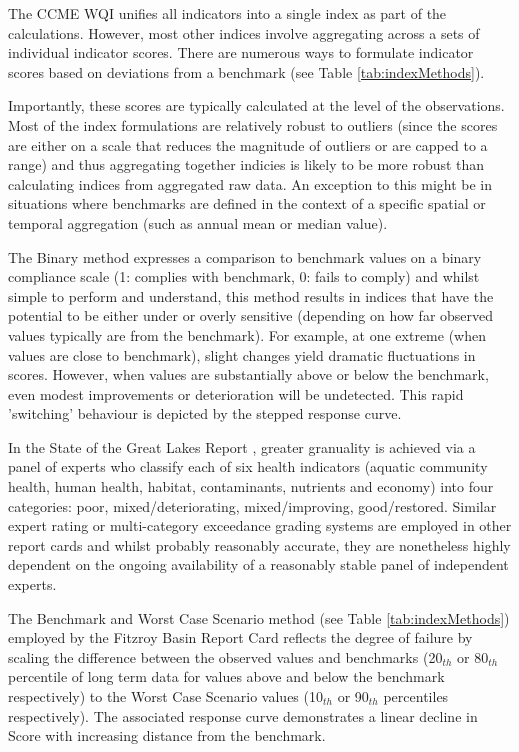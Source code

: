 The CCME WQI unifies all indicators into a single index as part of the calculations.  However, most
other indices involve aggregating across a sets of individual indicator scores.  There are numerous
ways to formulate indicator scores based on deviations from a benchmark (see Table
\ref{tab:indexMethods}).

Importantly, these scores are typically calculated at the level of the observations.  Most of the
index formulations are relatively robust to outliers (since the scores are either on a scale that
reduces the magnitude of outliers or are capped to a range) and thus aggregating together indicies
is likely to be more robust than calculating indices from aggregated raw data.  An exception to this
might be in situations where benchmarks are defined in the context of a specific spatial or temporal
aggregation (such as annual mean or median value).

The Binary method expresses a comparison to benchmark values on a binary compliance scale (1:
complies with benchmark, 0: fails to comply) and whilst simple to perform and understand, this
method results in indices that have the potential to be either under or overly sensitive (depending
on how far observed values typically are from the benchmark).  For example, at one extreme (when
values are close to benchmark), slight changes yield dramatic fluctuations in scores.  However, when
values are substantially above or below the benchmark, even modest improvements or deterioration
will be undetected.  This rapid 'switching' behaviour is depicted by the stepped response curve.

In the State of the Great Lakes Report \citep{EPA/EC-1995}, greater granuality is achieved via a
panel of experts who classify each of six health indicators (aquatic community health, human health,
habitat, contaminants, nutrients and economy) into four categories: poor, mixed/deteriorating,
mixed/improving, good/restored.  Similar expert rating or multi-category exceedance grading systems
are employed in other report cards \citep[e.g Tamar estuary Report Card;][]{Attard-2012} and whilst
probably reasonably accurate, they are nonetheless highly dependent on the ongoing availability of a
reasonably stable panel of independent experts.

The Benchmark and Worst Case Scenario method (see Table \ref{tab:indexMethods}) employed by the
Fitzroy Basin Report Card \citep{Jones-2013} reflects the degree of failure by scaling the
difference between the observed values and benchmarks (20$_{th}$ or 80$_{th}$ percentile of long
term data for values above and below the benchmark respectively) to the Worst Case Scenario values
(10$_{th}$ or 90$_{th}$ percentiles respectively).  The associated response curve demonstrates a
linear decline in Score with increasing distance from the benchmark.

